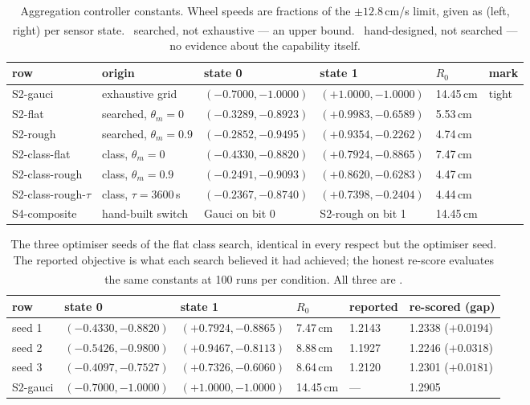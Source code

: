 \documentclass[11pt,a4paper]{article}
\newcommand{\dg}{\textsuperscript{\dag}}
\newcommand{\ddg}{\textsuperscript{\ddag}}
\begin{document}
\begin{table}[h]
\centering
\caption{Aggregation controller constants. Wheel speeds are fractions of the
$\pm 12.8$\,cm/s limit, given as (left, right) per sensor state. \dg\ searched,
not exhaustive --- an upper bound. \ddg\ hand-designed, not searched --- no
evidence about the capability itself.}
\small
\begin{tabular}{llllll}
\toprule
row & origin & state 0 & state 1 & $R_0$ & mark \\
\midrule
S2-gauci & exhaustive grid & $(-0.7000, -1.0000)$ & $(+1.0000, -1.0000)$ & 14.45\,cm & tight \\
S2-flat & searched, $\theta_m = 0$ & $(-0.3289, -0.8923)$ & $(+0.9983, -0.6589)$ & 5.53\,cm & \dg \\
S2-rough & searched, $\theta_m = 0.9$ & $(-0.2852, -0.9495)$ & $(+0.9354, -0.2262)$ & 4.74\,cm & \dg \\
S2-class-flat & class, $\theta_m = 0$ & $(-0.4330, -0.8820)$ & $(+0.7924, -0.8865)$ & 7.47\,cm & \dg \\
S2-class-rough & class, $\theta_m = 0.9$ & $(-0.2491, -0.9093)$ & $(+0.8620, -0.6283)$ & 4.47\,cm & \dg \\
S2-class-rough-$\tau$ & class, $\tau = 3600$\,s & $(-0.2367, -0.8740)$ & $(+0.7398, -0.2404)$ & 4.44\,cm & \dg \\
S4-composite & hand-built switch & Gauci on bit 0 & S2-rough on bit 1 & 14.45\,cm & \ddg \\
\bottomrule
\end{tabular}
\end{table}

\begin{table}[h]
\centering
\caption{The three optimiser seeds of the flat class search, identical in every
respect but the optimiser seed. The reported objective is what each search
believed it had achieved; the honest re-score evaluates the same constants at
100 runs per condition. All three are \dg.}
\small
\begin{tabular}{llllll}
\toprule
row & state 0 & state 1 & $R_0$ & reported & re-scored (gap) \\
\midrule
seed 1 & $(-0.4330, -0.8820)$ & $(+0.7924, -0.8865)$ & 7.47\,cm & 1.2143 & 1.2338 ($+0.0194$) \\
seed 2 & $(-0.5426, -0.9800)$ & $(+0.9467, -0.8113)$ & 8.88\,cm & 1.1927 & 1.2246 ($+0.0318$) \\
seed 3 & $(-0.4097, -0.7527)$ & $(+0.7326, -0.6060)$ & 8.64\,cm & 1.2120 & 1.2301 ($+0.0181$) \\
S2-gauci & $(-0.7000, -1.0000)$ & $(+1.0000, -1.0000)$ & 14.45\,cm & --- & 1.2905 \\
\bottomrule
\end{tabular}
\end{table}
\end{document}
